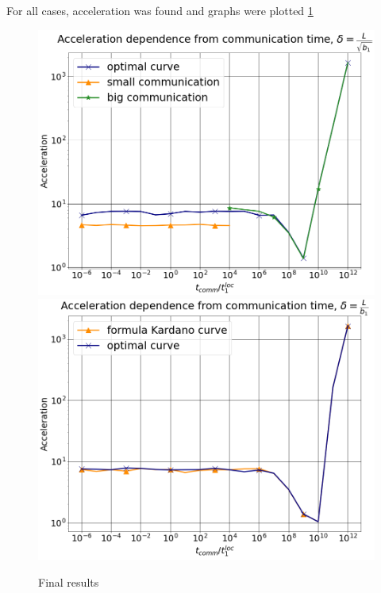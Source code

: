 \documentclass{article}
\begin{document}
For all cases, acceleration was found and graphs were plotted \ref{ris:image}

\begin{figure}[!ht]
    {\includegraphics[scale = 0.24]{final_graph1.png}}
    {\includegraphics[scale = 0.24]{final_graph2.png}}
    \caption{Final results}
    \label{ris:image}
\end{figure}


\end{document}
